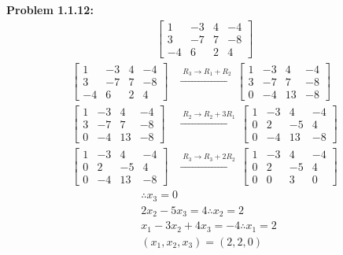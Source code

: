 \documentclass[12pt]{article}
\begin{document}
\textbf{Problem 1.1.12:} \begin{align*}
    \begin{bmatrix}
        1 & -3 & 4 & -4 \\
        3 & -7 & 7 & -8 \\
        -4 & 6 & 2 & 4
    \end{bmatrix}
\end{align*} \begin{align*}
    \begin{bmatrix}
        1 & -3 & 4 & -4 \\
        3 & -7 & 7 & -8 \\
        -4 & 6 & 2 & 4
    \end{bmatrix}
    & \xrightarrow{\; R_3 \to R_1 + R_2 \;}
    \begin{bmatrix}
        1 & -3 & 4 & -4 \\
        3 & -7 & 7 & -8 \\
        0 & -4 & 13 & -8
    \end{bmatrix} \\[6pt]
    \begin{bmatrix}
        1 & -3 & 4 & -4 \\
        3 & -7 & 7 & -8 \\
        0 & -4 & 13 & -8
    \end{bmatrix} 
    & \xrightarrow{\; R_2 \to R_2 + 3R_1 \;}
    \begin{bmatrix}
        1 & -3 & 4 & -4 \\
        0 & 2 & -5 & 4 \\
        0 & -4 & 13 & -8
    \end{bmatrix} \\[6pt]
    \begin{bmatrix}
        1 & -3 & 4 & -4 \\
        0 & 2 & -5 & 4 \\
        0 & -4 & 13 & -8
    \end{bmatrix}
    & \xrightarrow{\; R_3 \to R_3 + 2R_2 \;}
    \begin{bmatrix}
        1 & -3 & 4 & -4 \\
        0 & 2 & -5 & 4 \\
        0 & 0 & 3 & 0
    \end{bmatrix}
\end{align*} \begin{align*}
    & \therefore x_3 = 0 \\[6pt]
    & 2x_2 - 5x_3 = 4 \therefore x_2 = 2 \\[6pt]
    & x_1 - 3x_2 + 4x_3 = -4 \therefore x_1 = 2 \\[6pt]
    & \boxed{(x_1, x_2, x_3) = (2, 2, 0)}
\end{align*}
\end{document}
